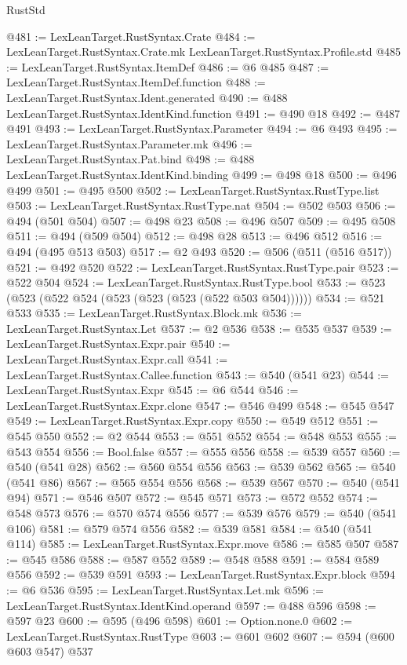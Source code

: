 \begin{lexlean}{RustStd}
\begin{coremodule}
@481 := LexLeanTarget.RustSyntax.Crate
@484 := LexLeanTarget.RustSyntax.Crate.mk LexLeanTarget.RustSyntax.Profile.std
@485 := LexLeanTarget.RustSyntax.ItemDef
@486 := @6 @485
@487 := LexLeanTarget.RustSyntax.ItemDef.function
@488 := LexLeanTarget.RustSyntax.Ident.generated
@490 := @488 LexLeanTarget.RustSyntax.IdentKind.function
@491 := @490 @18
@492 := @487 @491
@493 := LexLeanTarget.RustSyntax.Parameter
@494 := @6 @493
@495 := LexLeanTarget.RustSyntax.Parameter.mk
@496 := LexLeanTarget.RustSyntax.Pat.bind
@498 := @488 LexLeanTarget.RustSyntax.IdentKind.binding
@499 := @498 @18
@500 := @496 @499
@501 := @495 @500
@502 := LexLeanTarget.RustSyntax.RustType.list
@503 := LexLeanTarget.RustSyntax.RustType.nat
@504 := @502 @503
@506 := @494 (@501 @504)
@507 := @498 @23
@508 := @496 @507
@509 := @495 @508
@511 := @494 (@509 @504)
@512 := @498 @28
@513 := @496 @512
@516 := @494 (@495 @513 @503)
@517 := @2 @493
@520 := @506 (@511 (@516 @517))
@521 := @492 @520
@522 := LexLeanTarget.RustSyntax.RustType.pair
@523 := @522 @504
@524 := LexLeanTarget.RustSyntax.RustType.bool
@533 := @523 (@523 (@522 @524 (@523 (@523 (@523 (@522 @503 @504))))))
@534 := @521 @533
@535 := LexLeanTarget.RustSyntax.Block.mk
@536 := LexLeanTarget.RustSyntax.Let
@537 := @2 @536
@538 := @535 @537
@539 := LexLeanTarget.RustSyntax.Expr.pair
@540 := LexLeanTarget.RustSyntax.Expr.call
@541 := LexLeanTarget.RustSyntax.Callee.function
@543 := @540 (@541 @23)
@544 := LexLeanTarget.RustSyntax.Expr
@545 := @6 @544
@546 := LexLeanTarget.RustSyntax.Expr.clone
@547 := @546 @499
@548 := @545 @547
@549 := LexLeanTarget.RustSyntax.Expr.copy
@550 := @549 @512
@551 := @545 @550
@552 := @2 @544
@553 := @551 @552
@554 := @548 @553
@555 := @543 @554
@556 := Bool.false
@557 := @555 @556
@558 := @539 @557
@560 := @540 (@541 @28)
@562 := @560 @554 @556
@563 := @539 @562
@565 := @540 (@541 @86)
@567 := @565 @554 @556
@568 := @539 @567
@570 := @540 (@541 @94)
@571 := @546 @507
@572 := @545 @571
@573 := @572 @552
@574 := @548 @573
@576 := @570 @574 @556
@577 := @539 @576
@579 := @540 (@541 @106)
@581 := @579 @574 @556
@582 := @539 @581
@584 := @540 (@541 @114)
@585 := LexLeanTarget.RustSyntax.Expr.move
@586 := @585 @507
@587 := @545 @586
@588 := @587 @552
@589 := @548 @588
@591 := @584 @589 @556
@592 := @539 @591
@593 := LexLeanTarget.RustSyntax.Expr.block
@594 := @6 @536
@595 := LexLeanTarget.RustSyntax.Let.mk
@596 := LexLeanTarget.RustSyntax.IdentKind.operand
@597 := @488 @596
@598 := @597 @23
@600 := @595 (@496 @598)
@601 := Option.none.{0}
@602 := LexLeanTarget.RustSyntax.RustType
@603 := @601 @602
@607 := @594 (@600 @603 @547) @537

\end{coremodule}
\end{lexlean}
